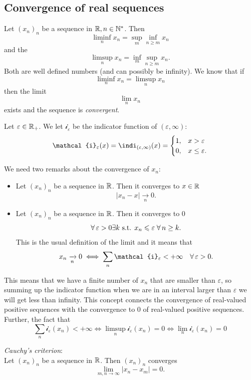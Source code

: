 \documentclass{report}
\begin{document}
\subsection{Convergence of real sequences}
Let ${(x_n)}_n$ be a sequence in $\mathbb{R},n\in\mathbb{N}^{*}$. Then 
\[\liminf_nx_n=\sup_m\inf_{n\geq m}x_n\]
and the 
\[\limsup_n x_n=\inf_m\sup_{n\geq m}x_n.\]
Both are well defined numbers (and can possibly be infinity). We know that if
\[\liminf_nx_n=\limsup_n x_n\]
then the limit
\[\lim_{n}x_n\]
exists and the sequence is \emph{convergent}.
\begin{notation}
	Let $\varepsilon\in\mathbb{R}_+$. We let $\mathcal{i}_\varepsilon$  be the indicator function of $(\varepsilon,\infty)$:
	\[\mathcal{i}_\varepsilon(x)=\indi_{(\varepsilon,\infty)}(x)=\begin{cases}
		1, &x>\varepsilon\\
		0, &x\leq \varepsilon.
	\end{cases}\]
\end{notation}
We need two remarks about the convergence of $x_n$:
\begin{remark}
	\begin{itemize}
		\item Let ${(x_n)}_{n}$ be a sequence in $\mathbb{R}$. Then it converges to $x\in\mathbb{R}$ \ifonly{} 
		\[|x_n-x|\xrightarrow[n]{}0.\]
		\item Let ${(x_n)}_{n}$ be a sequence in $\mathbb{R}$. Then it converges to 0 \ifonly{}
		\[\forall\,\varepsilon>0\exists k\text{ s.t. }x_{n}\leqslant\varepsilon\;\forall\, n\geq k.\]
		This is the usual definition of the limit and it means that 
		\[x_n\xrightarrow[n]{}0\iff\sum_n\mathcal{i}_\varepsilon<+\infty\quad\every\varepsilon>0.\]
	\end{itemize}
\end{remark}
This means that we have a finite number of $x_{n}$ that are smaller than $\varepsilon$, so summing up the indicator function when we are in an interval larger than $\varepsilon$ we will get less than infinity. This concept connects the convergence of real-valued positive sequences with the convergence to 0 of real-valued positive sequences.\\
Further, the fact that
\[\sum_n\mathcal{i}_\varepsilon(x_n)<+\infty\iff\limsup_n\mathcal{i}_\varepsilon(x_n)=0\iff\lim_n\mathcal{i}_\varepsilon(x_n)=0\]
\begin{proposition}
	\emph{Cauchy's criterion}:\\
	Let ${(x_n)}_{n}$ be a sequence in $\mathbb{R}$. Then ${(x_n)}_{n}$ converges \ifonly{}
	\[\lim_{m,n\to\infty}|x_n-x_m|=0.\]
\end{proposition}
\end{document}
